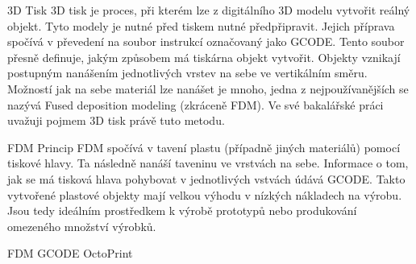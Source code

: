 3D Tisk
3D tisk je proces, při kterém lze z digitálního 3D modelu vytvořit reálný objekt.
Tyto modely je nutné před tiskem nutné předpřipravit.
Jejich příprava spočívá v převedení na soubor instrukcí označovaný jako GCODE.
Tento soubor přesně definuje, jakým způsobem má tiskárna objekt vytvořit.
Objekty vznikají postupným nanášením jednotlivých vrstev na sebe ve vertikálním směru.
Možností jak na sebe materiál lze nanášet je mnoho, jedna z nejpoužívanějších se nazývá Fused deposition modeling (zkráceně FDM).
Ve své bakalářské práci uvažuji pojmem 3D tisk právě tuto metodu.

FDM
Princip FDM spočívá v tavení plastu (případně jiných materiálů) pomocí tiskové hlavy.
Ta následně nanáší taveninu ve vrstvách na sebe.
Informace o tom, jak se má tisková hlava pohybovat v jednotlivých vstvách údává GCODE.
Takto vytvořené plastové objekty mají velkou výhodu v nízkých nákladech na výrobu.
Jsou tedy ideálním prostředkem k výrobě prototypů nebo produkování omezeného množství výrobků.

FDM
GCODE
OctoPrint
